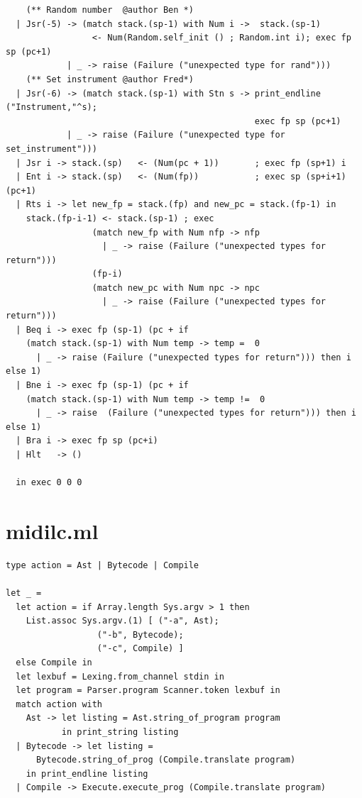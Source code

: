 \documentclass[12pt,A4]{book}
\begin{document}
\begin{verbatim}
    (** Random number  @author Ben *)
  | Jsr(-5) -> (match stack.(sp-1) with Num i ->  stack.(sp-1) 
                 <- Num(Random.self_init () ; Random.int i); exec fp sp (pc+1)
            | _ -> raise (Failure ("unexpected type for rand")))
    (** Set instrument @author Fred*)
  | Jsr(-6) -> (match stack.(sp-1) with Stn s -> print_endline ("Instrument,"^s); 
                                                 exec fp sp (pc+1)
			| _ -> raise (Failure ("unexpected type for set_instrument")))
  | Jsr i -> stack.(sp)   <- (Num(pc + 1))       ; exec fp (sp+1) i
  | Ent i -> stack.(sp)   <- (Num(fp))           ; exec sp (sp+i+1) (pc+1)
  | Rts i -> let new_fp = stack.(fp) and new_pc = stack.(fp-1) in
    stack.(fp-i-1) <- stack.(sp-1) ; exec 
                 (match new_fp with Num nfp -> nfp  
                   | _ -> raise (Failure ("unexpected types for return"))) 
                 (fp-i) 
                 (match new_pc with Num npc -> npc  
                   | _ -> raise (Failure ("unexpected types for return")))
  | Beq i -> exec fp (sp-1) (pc + if 
    (match stack.(sp-1) with Num temp -> temp =  0 
      | _ -> raise (Failure ("unexpected types for return"))) then i else 1)
  | Bne i -> exec fp (sp-1) (pc + if 
    (match stack.(sp-1) with Num temp -> temp !=  0 
      | _ -> raise  (Failure ("unexpected types for return"))) then i else 1)
  | Bra i -> exec fp sp (pc+i)
  | Hlt   -> ()

  in exec 0 0 0
\end{verbatim}
\section{midilc.ml}
\begin{verbatim}
type action = Ast | Bytecode | Compile

let _ =
  let action = if Array.length Sys.argv > 1 then
    List.assoc Sys.argv.(1) [ ("-a", Ast);
			      ("-b", Bytecode);
			      ("-c", Compile) ]
  else Compile in
  let lexbuf = Lexing.from_channel stdin in
  let program = Parser.program Scanner.token lexbuf in
  match action with
    Ast -> let listing = Ast.string_of_program program
           in print_string listing
  | Bytecode -> let listing =
      Bytecode.string_of_prog (Compile.translate program)
    in print_endline listing
  | Compile -> Execute.execute_prog (Compile.translate program)
 
\end{verbatim}
\end{document}
